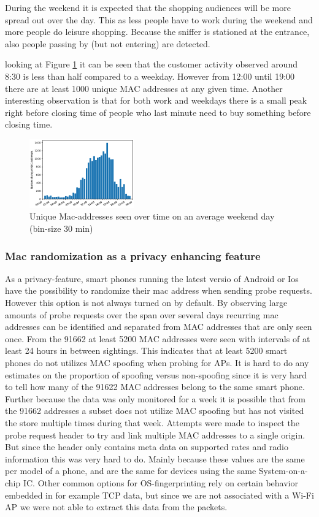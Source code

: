 \documentclass[conference,compsoc]{IEEEtran}
\begin{document}
During the weekend it is expected that the shopping audiences will be more spread out over the day. This as less people have to work during the weekend and more people do leisure shopping. Because the sniffer is stationed at the entrance, also people passing by (but not entering) are detected.

looking at Figure \ref{fig:SaturdayHist} it can be seen that the customer activity observed around 8:30 is less than half compared to a weekday. However from 12:00 until 19:00 there are at least 1000 unique MAC addresses at any given time. Another interesting observation is that for both work and weekdays there is a small peak right before closing time of people who last minute need to buy something before closing time. 
\begin{figure}[h!]
    \centering
    \includegraphics[width=0.4\textwidth]{img/daySat.png} 
    \caption{Unique Mac-addresses seen over time on an average weekend day (bin-size 30 min)}
    \label{fig:SaturdayHist}
\end{figure}

\subsubsection{Mac randomization as a privacy enhancing feature}
As a privacy-feature, smart phones running the latest versio of Android or Ios have the possibility to randomize their mac address when sending probe requests. However this option is not always turned on by default. By observing large amounts of probe requests over the span over several days recurring mac addresses can be identified and separated from MAC addresses that are only seen once. From the 91662 at least 5200 MAC addresses were seen with intervals of at least 24 hours in between sightings. This indicates that at least 5200 smart phones do not utilizes MAC spoofing when probing for APs. It is hard to do any estimates on the proportion of spoofing versus non-spoofing since it is very hard to tell how many of the 91622 MAC addresses belong to the same smart phone. Further because the data was only monitored for a week it is possible that from the 91662 addresses a subset does not utilize MAC spoofing but has not visited the store multiple times during that week. 
Attempts were made to inspect the probe request header to try and link multiple MAC addresses to a single origin. But since the header only contains meta data on supported rates and radio information this was very hard to do. Mainly because these values are the same per model of a phone, and are the same for devices using the same System-on-a-chip IC. Other common options for OS-fingerprinting rely on certain behavior embedded in for example TCP data, but since we are not associated with a Wi-Fi AP we were not able to extract this data from the packets.
\end{document}
